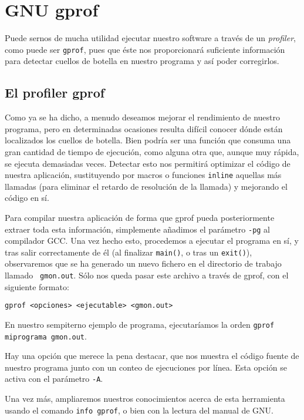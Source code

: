 
\chapter{GNU gprof}
\label{gprof}
\label{gprof.tex}

Puede  sernos de  mucha  utilidad ejecutar  nuestro software  a
través de un  {\em profiler}, como puede ser {\tt  gprof}, pues que éste
nos  proporcionará suficiente  información  para  detectar cuellos  de
botella en nuestro programa y así poder corregirlos.

\section{El profiler gprof}

Como ya  se ha dicho,  a menudo  deseamos mejorar  el  rendimiento  de
nuestro  programa,  pero  en determinadas  ocasiones  resulta  difícil
conocer dónde  están localizados los  cuellos de botella.  Bien podría
ser una función que consuma una  gran cantidad de tiempo de ejecución,
como alguna otra que, aunque  muy rápida, se ejecuta demasiadas veces.
Detectar esto nos  permitirá optimizar el código de nuestra aplicación,
sustituyendo por macros o funciones {\tt inline} aquellas más llamadas
(para eliminar el retardo de resolución  de la llamada) y mejorando el
código en sí.

Para   compilar  nuestra   aplicación   de  forma   que  gprof   pueda
posteriormente extraer toda esta  información, simplemente añadimos el
parámetro {\tt -pg} al compilador  GCC. Una vez hecho esto, procedemos
a ejecutar  el programa en  sí, y tras  salir correctamente de  él (al
finalizar {\tt main()},  o tras un {\tt exit()}),  observaremos que se
ha generado un nuevo fichero en  el directorio de trabajo llamado {\tt
gmon.out}. Sólo nos queda pasar este archivo a través de gprof, con el
siguiente formato: \\

\begin{verbatim}
gprof <opciones> <ejecutable> <gmon.out>
\end{verbatim}

En  nuestro  sempiterno  ejemplo  de  programa,  ejecutaríamos la orden
{\tt  gprof miprograma gmon.out}.

Hay una opción que merece la  pena destacar, que nos muestra el código
fuente  de nuestro  programa junto  con un  conteo de  ejecuciones por
línea. Esta opción se activa con el parámetro {\tt -A}.

Una  vez  más,  ampliaremos  nuestros  conocimientos  acerca  de  esta
herramienta usando el comando {\tt info  gprof}, o bien con la lectura
del manual de GNU. %

